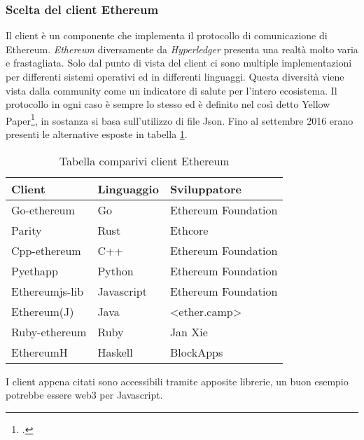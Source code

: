 \subsubsection{Scelta del client Ethereum}
Il client è un componente che implementa il protocollo di comunicazione di Ethereum. \emph{Ethereum} diversamente da \emph{Hyperledger} presenta una realtà molto varia e frastagliata. Solo dal punto di vista del client ci sono multiple implementazioni per differenti sistemi operativi ed in differenti linguaggi. Questa diversità viene vista dalla community come un indicatore di salute per l’intero ecosistema. Il protocollo in ogni caso è sempre lo stesso ed è definito nel così detto Yellow Paper\footcite{site:ethereum-yellow-paper}, in sostanza si basa sull’utilizzo di file Json. 
Fino al settembre 2016 erano presenti le alternative esposte in tabella \ref{tab:comp-client}.
\begin{table}[!h] %
    \caption{Tabella comparivi client Ethereum}
    \label{tab:comp-client}
    \begin{tabularx}{\textwidth}{|X|X|X|}
    \hline
    \textbf{Client} & \textbf{Linguaggio} & \textbf{Sviluppatore}\\
    \hline
    Go-ethereum   & Go & Ethereum Foundation \\
    \hline
    Parity   & Rust & Ethcore \\
    \hline
    Cpp-ethereum   & C++ & Ethereum Foundation\\
    \hline
    Pyethapp  & Python & Ethereum Foundation\\
    \hline
    Ethereumjs-lib  & Javascript & Ethereum Foundation\\
    \hline
    Ethereum(J)  & Java & <ether.camp>\\
    \hline
    Ruby-ethereum  & Ruby & Jan Xie\\
    \hline
    EthereumH  & Haskell & BlockApps\\
    \hline
    \end{tabularx}
\end{table}%
I client appena citati sono accessibili tramite apposite librerie, un buon esempio potrebbe essere web3 per Javascript.
